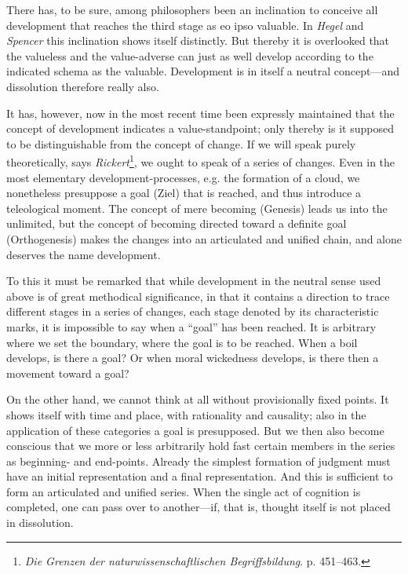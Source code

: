 \documentclass[12pt,a4paper]{book}
\newcommand{\opage}[1]{\marginnote{\footnotesize\textit{[#1]}}}
\begin{document}
There has, to be sure, among philosophers been an inclination to conceive all
development that reaches the third stage as eo ipso valuable. In \emph{Hegel}
and \emph{Spencer} this inclination shows itself distinctly. But thereby it is
overlooked that the valueless and the value-adverse can just as well develop
according to the indicated schema as the valuable. Development is in itself a
neutral concept---and dissolution therefore really also.

It has, however, now in the most recent time been expressly maintained that
the concept of development indicates a value-standpoint; only thereby is it
supposed to be distinguishable from the concept of change. If we will speak
purely theoretically, says \emph{Rickert}\footnote{\emph{Die Grenzen der
naturwissenschaftlischen Begriffsbildung}. p. 451--463.}, we ought to speak
of a series of changes. Even in the most elementary development-processes,
e.g. the formation of a cloud, we nonetheless presuppose a goal (Ziel) that
is reached, and thus introduce a teleological moment. The concept of mere
becoming (Genesis) leads us into the unlimited, but the concept of becoming
directed toward a definite goal (Orthogenesis) makes the changes into an
articulated and unified chain, and alone deserves the name development.

To this it must be remarked that while development in the neutral sense used
above is of great methodical significance, in that it contains a direction to
trace different stages in a series of changes, each stage denoted by its
characteristic marks, it is impossible to say when a ``goal'' has been
reached. It is arbitrary where we set the boundary, where the goal is to be
reached. When a boil develops, is there a goal? Or when moral wickedness
develops, is there then a movement toward a goal?

On the other hand, we cannot think at all without provisionally fixed points.
It shows itself with time and place, with rationality and causality; also in
the application of \opage{237}these categories a goal is presupposed. But we then also
become conscious that we more or less arbitrarily hold fast certain members in
the series as beginning- and end-points. Already the simplest formation of
judgment must have an initial representation and a final representation. And
this is sufficient to form an articulated and unified series. When the single
act of cognition is completed, one can pass over to another---if, that is,
thought itself is not placed in dissolution.
\end{document}

